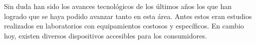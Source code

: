 Sin duda han sido los avances tecnológicos de los últimos años los que han logrado que se haya podido avanzar tanto en esta área. Antes estos eran estudios realizados en laboratorios con equipamientos costosos y específicos. En cambio hoy, existen diversos dispositivos accesibles para los consumidores. 
